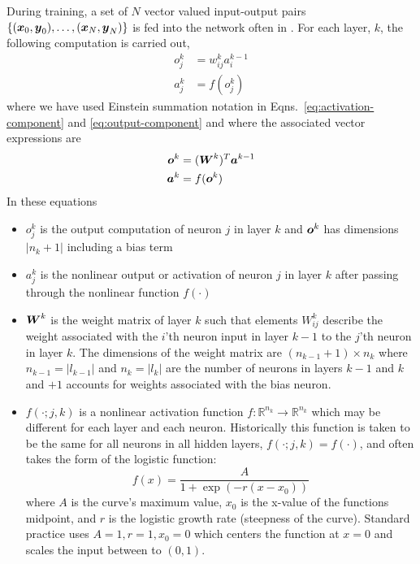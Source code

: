 \documentclass[12pt,notitlepage]{article}
\begin{document}
During training, a set of $N$ vector valued input-output pairs $\{(\boldsymbol{x}_{0},\boldsymbol{y}_{0}), \dots,
(\boldsymbol{x}_{N},\boldsymbol{y}_{N})\}$ is fed into the network often in .  For each layer, $k$, the
following computation is carried out,
\begin{align}
  \label{eq:activation-component}
  o_{j}^{k} &= w_{ij}^{k}a_{i}^{k-1}\\
  \label{eq:output-component}
  a_{j}^{k} &= f( o_{j}^{k})  
\end{align}
where we have used Einstein summation notation in
Eqns.~\ref{eq:activation-component} and \ref{eq:output-component} and
where the associated vector expressions are
\begin{align}
  \label{eq:activation-matrix}
  \boldsymbol{o}^{k} &= (\boldsymbol{W}^{k})^{T}\boldsymbol{a}^{k-1}\\
  \label{eq:output-matrix}
  \boldsymbol{a}^{k} &= f(\boldsymbol{o}^{k})
\end{align}
In these equations
\begin{itemize}
\item $o_{j}^{k}$ is the output computation of neuron $j$ in layer $k$
  and $\boldsymbol{o}^{k}$ has dimensions $|n_{k}+1|$ including a bias term
\item $a_{j}^{k}$ is the nonlinear output or activation of neuron $j$ in layer $k$ after
  passing through the nonlinear function $f(\cdot)$
\item $\boldsymbol{W}^{k}$ is the weight matrix of layer $k$ such that
  elements $W_{ij}^{k}$ describe the weight associated with the $i$'th
  neuron input in layer $k-1$ to the $j$'th neuron in layer $k$.
  The dimensions of the weight matrix are $( n_{k-1} + 1 ) \times
  n_{k}$ where $n_{k-1} = |l_{k-1}|$ and $n_{k}
  = |l_{k}|$ are the number of neurons in layers $k-1$ and $k$ and
  $+1$ accounts for weights associated with the bias neuron.
\item $f(\cdot;j,k)$ is a nonlinear activation function $f: \mathbb{R}^{n_{k}} \to
  \mathbb{R}^{n_{k}}$ which may be different for each layer and each neuron.  Historically
  this function is taken to be the same for all neurons in all hidden
  layers,
  $f( \cdot; j,k ) = f( \cdot )$, and often takes the form of the
  logistic function:
  \begin{equation}
    \label{eq:logistic-fun}
    f(x) = \frac{A}{1+\exp(-r(x-x_{0}))}
  \end{equation}
  where $A$ is the curve's maximum value, $x_{0}$ is the x-value of
  the functions midpoint, and $r$ is the logistic growth rate
  (steepness of the curve).  Standard practice uses $A=1, r=1, x_{0} =
  0$ which centers the function at $x=0$ and scales the input between
  to $(0,1)$.
\end{itemize}
\end{document}
